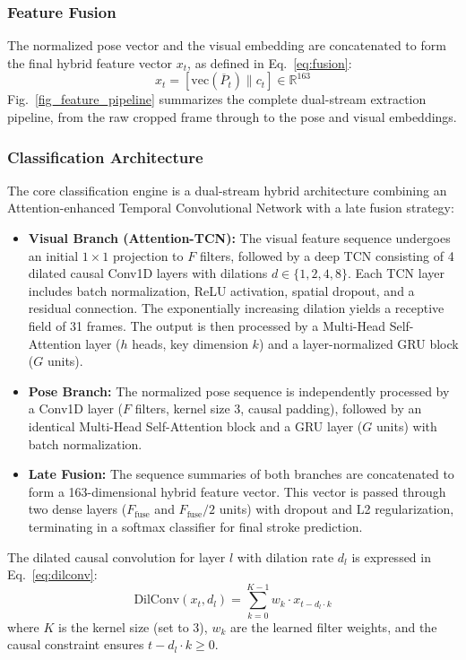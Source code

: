 \documentclass[pdflatex,sn-mathphys-num]{sn-jnl}
\theoremstyle{thmstyleone}%
\theoremstyle{thmstyletwo}%
\theoremstyle{thmstylethree}%
\begin{document}
\subsubsection{Feature Fusion}
The normalized pose vector and the visual embedding are concatenated to form the final hybrid feature vector $x_t$, as defined in Eq.~\eqref{eq:fusion}:
\begin{equation}
x_{t} = [\text{vec}(\overline{P}_{t}) \parallel c_{t}] \in \mathbb{R}^{163}
\label{eq:fusion}
\end{equation}
Fig.~\ref{fig_feature_pipeline} summarizes the complete dual-stream extraction pipeline, from the raw cropped frame through to the pose and visual embeddings.

\subsubsection{Classification Architecture}
The core classification engine is a dual-stream hybrid architecture combining an Attention-enhanced Temporal Convolutional Network with a late fusion strategy:
\begin{itemize}
    \item \textbf{Visual Branch (Attention-TCN):} The visual feature sequence undergoes an initial $1 \times 1$ projection to $F$ filters, followed by a deep TCN consisting of 4 dilated causal Conv1D layers with dilations $d \in \{1, 2, 4, 8\}$. Each TCN layer includes batch normalization, ReLU activation, spatial dropout, and a residual connection. The exponentially increasing dilation yields a receptive field of 31 frames. The output is then processed by a Multi-Head Self-Attention layer ($h$ heads, key dimension $k$) and a layer-normalized GRU block ($G$ units).
    \item \textbf{Pose Branch:} The normalized pose sequence is independently processed by a Conv1D layer ($F$ filters, kernel size 3, causal padding), followed by an identical Multi-Head Self-Attention block and a GRU layer ($G$ units) with batch normalization.
    \item \textbf{Late Fusion:} The sequence summaries of both branches are concatenated to form a 163-dimensional hybrid feature vector. This vector is passed through two dense layers ($F_{\text{fuse}}$ and $F_{\text{fuse}}/2$ units) with dropout and L2 regularization, terminating in a softmax classifier for final stroke prediction.
\end{itemize}

The dilated causal convolution for layer $l$ with dilation rate $d_l$ is expressed in Eq.~\eqref{eq:dilconv}:
\begin{equation}
\text{DilConv}(x_t, d_l) = \sum_{k=0}^{K-1} w_k \cdot x_{t - d_l \cdot k}
\label{eq:dilconv}
\end{equation}
\noindent where $K$ is the kernel size (set to 3), $w_k$ are the learned filter weights, and the causal constraint ensures $t - d_l \cdot k \ge 0$.
\end{document}

